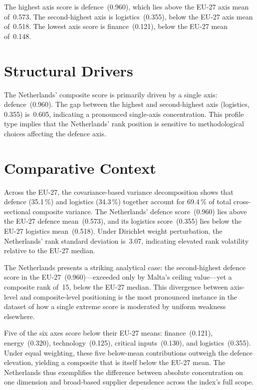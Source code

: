 \documentclass[12pt,a4paper]{article}
\begin{document}
The highest axis score is defence~(0.960), which lies above the EU-27 axis mean of~0.573.  The second-highest axis is logistics~(0.355), below the EU-27 axis mean of~0.518.  The lowest axis score is finance~(0.121), below the EU-27 mean of~0.148.


\section{Structural Drivers}
\label{sec:drivers}

\begin{sloppypar}
The Netherlands' composite score is primarily driven by a single axis: defence~(0.960).  The gap between the highest and second-highest axis (logistics, 0.355) is~0.605, indicating a pronounced single-axis concentration.  This profile type implies that the Netherlands' rank position is sensitive to methodological choices affecting the defence axis.
\end{sloppypar}


\section{Comparative Context}
\label{sec:comparative}

Across the EU-27, the covariance-based variance decomposition shows that defence (35.1\,\%) and logistics (34.3\,\%) together account for 69.4\,\% of total cross-sectional composite variance.  The Netherlands' defence score~(0.960) lies above the EU-27 defence mean~(0.573), and its logistics score~(0.355) lies below the EU-27 logistics mean~(0.518).  Under Dirichlet weight perturbation, the Netherlands' rank standard deviation is~3.07, indicating elevated rank volatility relative to the EU-27 median.



The Netherlands presents a striking analytical case: the second-highest defence score in the EU-27~(0.960)---exceeded only by Malta's ceiling value---yet a composite rank of~15, below the EU-27 median.  This divergence between axis-level and composite-level positioning is the most pronounced instance in the dataset of how a single extreme score is moderated by uniform weakness elsewhere.

Five of the six axes score below their EU-27 means: finance~(0.121), energy~(0.320), technology~(0.125), critical inputs~(0.130), and logistics~(0.355).  Under equal weighting, these five below-mean contributions outweigh the defence elevation, yielding a composite that is itself below the EU-27 mean.  The Netherlands thus exemplifies the difference between absolute concentration on one dimension and broad-based supplier dependence across the index's full scope.
\end{document}
